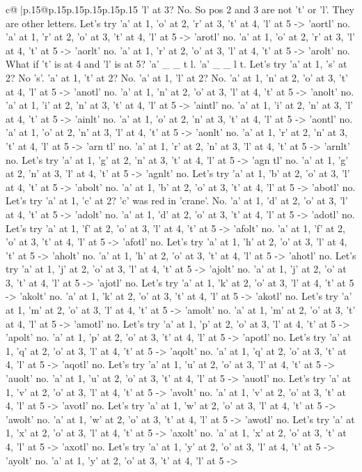 \documentclass{article}
\begin{document}
{\begin{supertabular}{c@{$\;$}|p{.15\linewidth}@{}p{.15\linewidth}p{.15\linewidth}p{.15\linewidth}p{.15\linewidth}p{.15\linewidth}}
{{{'l' at 3? No. So pos 2 and 3 are not 't' or 'l'. They are other letters. Let's try 'a' at 1, 'o' at 2, 'r' at 3, 't' at 4, 'l' at 5 {-}> 'aortl' no. 'a' at 1, 'r' at 2, 'o' at 3, 't' at 4, 'l' at 5 {-}> 'arotl' no. 'a' at 1, 'o' at 2, 'r' at 3, 'l' at 4, 't' at 5 {-}> 'aorlt' no. 'a' at 1, 'r' at 2, 'o' at 3, 'l' at 4, 't' at 5 {-}> 'arolt' no. What if 't' is at 4 and 'l' is at 5? 'a' \_ \_ t l. 'a' \_ \_ l t. Let's try 'a' at 1, 's' at 2? No 's'. 'a' at 1, 't' at 2? No. 'a' at 1, 'l' at 2? No. 'a' at 1, 'n' at 2, 'o' at 3, 't' at 4, 'l' at 5 {-}> 'anotl' no. 'a' at 1, 'n' at 2, 'o' at 3, 'l' at 4, 't' at 5 {-}> 'anolt' no. 'a' at 1, 'i' at 2, 'n' at 3, 't' at 4, 'l' at 5 {-}> 'aintl' no. 'a' at 1, 'i' at 2, 'n' at 3, 'l' at 4, 't' at 5 {-}> 'ainlt' no. 'a' at 1, 'o' at 2, 'n' at 3, 't' at 4, 'l' at 5 {-}> 'aontl' no. 'a' at 1, 'o' at 2, 'n' at 3, 'l' at 4, 't' at 5 {-}> 'aonlt' no. 'a' at 1, 'r' at 2, 'n' at 3, 't' at 4, 'l' at 5 {-}> 'arn tl' no. 'a' at 1, 'r' at 2, 'n' at 3, 'l' at 4, 't' at 5 {-}> 'arnlt' no. Let's try 'a' at 1, 'g' at 2, 'n' at 3, 't' at 4, 'l' at 5 {-}> 'agn tl' no. 'a' at 1, 'g' at 2, 'n' at 3, 'l' at 4, 't' at 5 {-}> 'agnlt' no. Let's try 'a' at 1, 'b' at 2, 'o' at 3, 'l' at 4, 't' at 5 {-}> 'abolt' no. 'a' at 1, 'b' at 2, 'o' at 3, 't' at 4, 'l' at 5 {-}> 'abotl' no. Let's try 'a' at 1, 'c' at 2? 'c' was red in 'crane'. No. 'a' at 1, 'd' at 2, 'o' at 3, 'l' at 4, 't' at 5 {-}> 'adolt' no. 'a' at 1, 'd' at 2, 'o' at 3, 't' at 4, 'l' at 5 {-}> 'adotl' no. Let's try 'a' at 1, 'f' at 2, 'o' at 3, 'l' at 4, 't' at 5 {-}> 'afolt' no. 'a' at 1, 'f' at 2, 'o' at 3, 't' at 4, 'l' at 5 {-}> 'afotl' no. Let's try 'a' at 1, 'h' at 2, 'o' at 3, 'l' at 4, 't' at 5 {-}> 'aholt' no. 'a' at 1, 'h' at 2, 'o' at 3, 't' at 4, 'l' at 5 {-}> 'ahotl' no. Let's try 'a' at 1, 'j' at 2, 'o' at 3, 'l' at 4, 't' at 5 {-}> 'ajolt' no. 'a' at 1, 'j' at 2, 'o' at 3, 't' at 4, 'l' at 5 {-}> 'ajotl' no. Let's try 'a' at 1, 'k' at 2, 'o' at 3, 'l' at 4, 't' at 5 {-}> 'akolt' no. 'a' at 1, 'k' at 2, 'o' at 3, 't' at 4, 'l' at 5 {-}> 'akotl' no. Let's try 'a' at 1, 'm' at 2, 'o' at 3, 'l' at 4, 't' at 5 {-}> 'amolt' no. 'a' at 1, 'm' at 2, 'o' at 3, 't' at 4, 'l' at 5 {-}> 'amotl' no. Let's try 'a' at 1, 'p' at 2, 'o' at 3, 'l' at 4, 't' at 5 {-}> 'apolt' no. 'a' at 1, 'p' at 2, 'o' at 3, 't' at 4, 'l' at 5 {-}> 'apotl' no. Let's try 'a' at 1, 'q' at 2, 'o' at 3, 'l' at 4, 't' at 5 {-}> 'aqolt' no. 'a' at 1, 'q' at 2, 'o' at 3, 't' at 4, 'l' at 5 {-}> 'aqotl' no. Let's try 'a' at 1, 'u' at 2, 'o' at 3, 'l' at 4, 't' at 5 {-}> 'auolt' no. 'a' at 1, 'u' at 2, 'o' at 3, 't' at 4, 'l' at 5 {-}> 'auotl' no. Let's try 'a' at 1, 'v' at 2, 'o' at 3, 'l' at 4, 't' at 5 {-}> 'avolt' no. 'a' at 1, 'v' at 2, 'o' at 3, 't' at 4, 'l' at 5 {-}> 'avotl' no. Let's try 'a' at 1, 'w' at 2, 'o' at 3, 'l' at 4, 't' at 5 {-}> 'awolt' no. 'a' at 1, 'w' at 2, 'o' at 3, 't' at 4, 'l' at 5 {-}> 'awotl' no. Let's try 'a' at 1, 'x' at 2, 'o' at 3, 'l' at 4, 't' at 5 {-}> 'axolt' no. 'a' at 1, 'x' at 2, 'o' at 3, 't' at 4, 'l' at 5 {-}> 'axotl' no. Let's try 'a' at 1, 'y' at 2, 'o' at 3, 'l' at 4, 't' at 5 {-}> 'ayolt' no. 'a' at 1, 'y' at 2, 'o' at 3, 't' at 4, 'l' at 5 {-}> }}}
\end{supertabular}}
\end{document}
